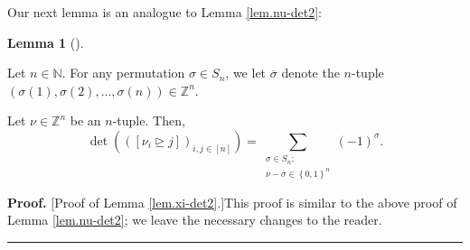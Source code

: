 \documentclass[numbers=enddot,12pt,final,onecolumn,notitlepage,english]{scrartcl}%
\theoremstyle{definition}
\newtheorem{lem}[theo]{Lemma}
\newenvironment{lemma}[1][]
{\begin{lem}[#1]\begin{leftbar}}
{\end{leftbar}\end{lem}}
\newenvironment{proof}[1][Proof]{\noindent\textbf{#1.} }{\ \rule{0.5em}{0.5em}}
\let\sumnonlimits\sum
\renewcommand{\sum}{\sumnonlimits\limits}
\newenvironment{vershort}{}{}
\begin{document}
Our next lemma is an analogue to Lemma \ref{lem.nu-det2}:

\begin{lemma}
\label{lem.xi-det2}Let $n\in\mathbb{N}$. For any permutation $\sigma\in S_{n}%
$, we let $\overline{\sigma}$ denote the $n$-tuple $\left(  \sigma\left(
1\right)  ,\sigma\left(  2\right)  ,\ldots,\sigma\left(  n\right)  \right)
\in\mathbb{Z}^{n}$.

Let $\nu\in\mathbb{Z}^{n}$ be an $n$-tuple. Then,%
\[
\det\left(  \left(  \left[  \nu_{i}\trianglerighteq j\right]  \right)
_{i,j\in\left[  n\right]  }\right)  =\sum_{\substack{\sigma\in S_{n}%
;\\\nu-\overline{\sigma}\in\left\{  0,1\right\}  ^{n}}}\left(  -1\right)
^{\sigma}.
\]

\end{lemma}

\begin{vershort}
\begin{proof}
[Proof of Lemma \ref{lem.xi-det2}.]This proof is similar to the above proof of
Lemma \ref{lem.nu-det2}; we leave the necessary changes to the reader.
\end{proof}
\end{vershort}
\end{document}
